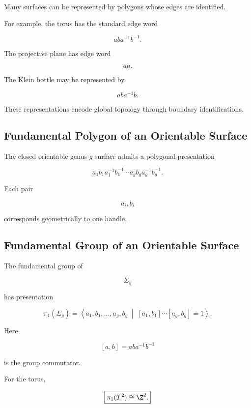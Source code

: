 Many surfaces can be represented by polygons whose edges are identified.

For example, the torus has the standard edge word

\[
\boxed{
aba^{-1}b^{-1}.
}
\]

The projective plane has edge word

\[
\boxed{
aa.
}
\]

The Klein bottle may be represented by

\[
\boxed{
aba^{-1}b.
}
\]

These representations encode global topology through boundary
identifications.

\subsection{Fundamental Polygon of an Orientable Surface}
\label{subsec:fundamental-polygon-orientable}

The closed orientable genus-\(g\) surface admits a polygonal presentation

\[
\boxed{
a_1b_1a_1^{-1}b_1^{-1}
\cdots
a_gb_ga_g^{-1}b_g^{-1}.
}
\]

Each pair

\[
a_i,b_i
\]

corresponds geometrically to one handle.

\subsection{Fundamental Group of an Orientable Surface}
\label{subsec:fundamental-group-orientable-surface}

The fundamental group of

\[
\Sigma_g
\]

has presentation

\[
\boxed{
\pi_1(\Sigma_g)
=
\left\langle
a_1,b_1,\ldots,a_g,b_g
\;\middle|\;
[a_1,b_1]\cdots[a_g,b_g]=1
\right\rangle.
}
\]

Here

\[
[a,b]
=
aba^{-1}b^{-1}
\]

is the group commutator.

For the torus,

\[
\boxed{
\pi_1(T^2)
\cong
\Z^2.
}
\]

